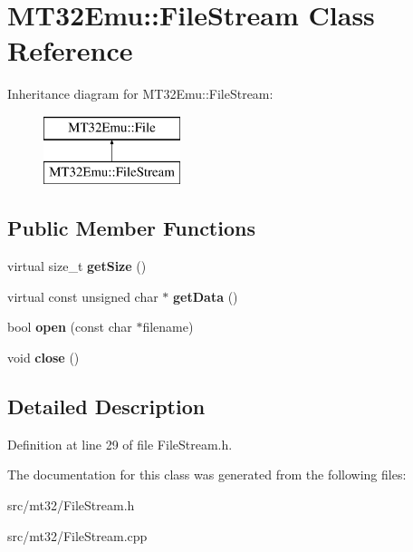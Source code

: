 \hypertarget{classMT32Emu_1_1FileStream}{\section{M\-T32\-Emu\-:\-:File\-Stream Class Reference}
\label{classMT32Emu_1_1FileStream}
}
Inheritance diagram for M\-T32\-Emu\-:\-:File\-Stream\-:\begin{figure}[H]
\begin{center}
\leavevmode
\includegraphics[height=2.000000cm]{classMT32Emu_1_1FileStream}
\end{center}
\end{figure}
\subsection*{Public Member Functions}
\begin{DoxyCompactItemize}
\item 
\hypertarget{classMT32Emu_1_1FileStream_a6bacd63c95f095bdbde4c149ba858eaf}{virtual size\-\_\-t {\bfseries get\-Size} ()}\label{classMT32Emu_1_1FileStream_a6bacd63c95f095bdbde4c149ba858eaf}

\item 
\hypertarget{classMT32Emu_1_1FileStream_a606a18a74ec26610ac90687f91177109}{virtual const unsigned char $\ast$ {\bfseries get\-Data} ()}\label{classMT32Emu_1_1FileStream_a606a18a74ec26610ac90687f91177109}

\item 
\hypertarget{classMT32Emu_1_1FileStream_a930e13a460bf02adf92456e360be70c0}{bool {\bfseries open} (const char $\ast$filename)}\label{classMT32Emu_1_1FileStream_a930e13a460bf02adf92456e360be70c0}

\item 
\hypertarget{classMT32Emu_1_1FileStream_a8ff7b10d1234b8d30abc6e3cff69e44a}{void {\bfseries close} ()}\label{classMT32Emu_1_1FileStream_a8ff7b10d1234b8d30abc6e3cff69e44a}

\end{DoxyCompactItemize}


\subsection{Detailed Description}


Definition at line 29 of file File\-Stream.\-h.



The documentation for this class was generated from the following files\-:\begin{DoxyCompactItemize}
\item 
src/mt32/File\-Stream.\-h\item 
src/mt32/File\-Stream.\-cpp\end{DoxyCompactItemize}
